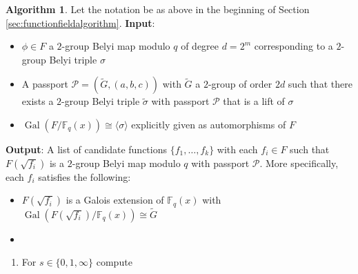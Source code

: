 \documentclass{dcthesis}
\newcommand{\mm}[1]{{\color{blue} \sf MM: [#1]}}
\newcommand{\wt}[1]{\widetilde{#1}}
\newcommand{\FF}{\mathbb{F}}
\DeclareMathOperator{\Gal}{Gal}
\numberwithin{equation}{section}
\theoremstyle{definition}
\newtheorem{alg}[equation]{Algorithm}
\theoremstyle{remark}
\begin{document}
{{    \begin{alg}
      \label{alg:getcandidates}
      Let the notation be
      as above in the beginning of
      Section
      \ref{sec:functionfieldalgorithm}.
      \newline
      \textbf{Input}:
      \begin{itemize}
        \item 
          $\phi\in F$
          a $2$-group Belyi map modulo $q$
          of degree $d=2^m$
          corresponding to a $2$-group
          Belyi triple $\sigma$
        \item
          A passport
          $\mathcal{P}=(\wt{G},(a,b,c))$
          with $\wt{G}$ a $2$-group of order
          $2d$ such that there
          exists a
          $2$-group Belyi triple
          $\wt{\sigma}$ with passport
          $\mathcal{P}$
          that is a lift of
          $\sigma$
        \item
          $\Gal(F/\FF_q(x))\cong
          \langle\sigma\rangle$
          explicitly given
          as automorphisms of $F$
      \end{itemize}
      \textbf{Output}:
      A list of candidate functions
      $\{f_1,\dots,f_k\}$ with each $f_i\in F$
      such that $F(\sqrt{f_i})$ is a
      $2$-group Belyi map modulo $q$
      with passport $\mathcal{P}$.
      More specifically, each $f_i$ satisfies
      the following:
      \begin{itemize}
        \item
          $F(\sqrt{f_i})$ is a Galois
          extension of $\FF_q(x)$
          with $\Gal(F(\sqrt{f_i})/\FF_q(x))
          \cong \wt{G}$
        \item
      \end{itemize}
      \begin{enumerate}
        \item\label{alg:gencandidates_setup}
          For $s\in\{0,1,\infty\}$
          compute
          \begin{align}
            \label{eqn:ramcoeffs}

\end{align}
\end{enumerate}
\end{alg}}}
\end{document}
